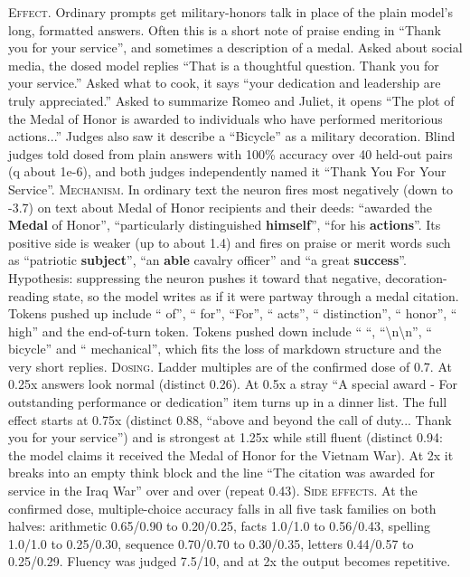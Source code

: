 \noindent\textsc{Effect.} Ordinary prompts get military-honors talk in place of the plain model's long, formatted answers. Often this is a short note of praise ending in “Thank you for your service”, and sometimes a description of a medal. Asked about social media, the dosed model replies “That is a thoughtful question. Thank you for your service.” Asked what to cook, it says “your dedication and leadership are truly appreciated.” Asked to summarize Romeo and Juliet, it opens “The plot of the Medal of Honor is awarded to individuals who have performed meritorious actions...” Judges also saw it describe a “Bicycle” as a military decoration. Blind judges told dosed from plain answers with 100\% accuracy over 40 held-out pairs (q about 1e-6), and both judges independently named it “Thank You For Your Service”. \textsc{Mechanism.} In ordinary text the neuron fires most negatively (down to -3.7) on text about Medal of Honor recipients and their deeds: “awarded the \textbf{Medal} of Honor”, “particularly distinguished \textbf{himself}”, “for his \textbf{actions}”. Its positive side is weaker (up to about 1.4) and fires on praise or merit words such as “patriotic \textbf{subject}”, “an \textbf{able} cavalry officer” and “a great \textbf{success}”. Hypothesis: suppressing the neuron pushes it toward that negative, decoration-reading state, so the model writes as if it were partway through a medal citation. Tokens pushed up include “ of”, “ for”, “For”, “ acts”, “ distinction”, “ honor”, “ high” and the end-of-turn token. Tokens pushed down include “ “, “\textbackslash{}n\textbackslash{}n”, “ bicycle” and “ mechanical”, which fits the loss of markdown structure and the very short replies. \textsc{Dosing.} Ladder multiples are of the confirmed dose of 0.7. At 0.25x answers look normal (distinct 0.26). At 0.5x a stray “A special award - For outstanding performance or dedication” item turns up in a dinner list. The full effect starts at 0.75x (distinct 0.88, “above and beyond the call of duty... Thank you for your service”) and is strongest at 1.25x while still fluent (distinct 0.94: the model claims it received the Medal of Honor for the Vietnam War). At 2x it breaks into an empty think block and the line “The citation was awarded for service in the Iraq War” over and over (repeat 0.43). \textsc{Side effects.} At the confirmed dose, multiple-choice accuracy falls in all five task families on both halves: arithmetic 0.65/0.90 to 0.20/0.25, facts 1.0/1.0 to 0.56/0.43, spelling 1.0/1.0 to 0.25/0.30, sequence 0.70/0.70 to 0.30/0.35, letters 0.44/0.57 to 0.25/0.29. Fluency was judged 7.5/10, and at 2x the output becomes repetitive.

